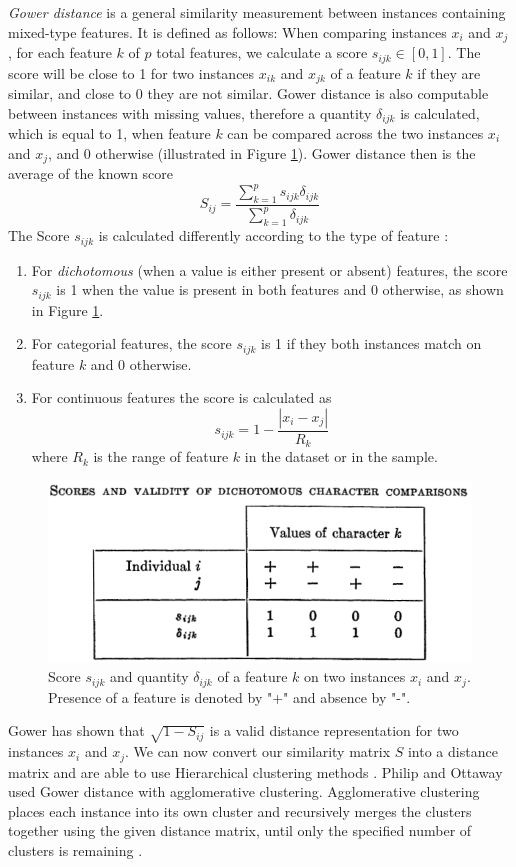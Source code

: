 \textit{Gower distance} \cite{gower} is a general similarity measurement between instances containing mixed-type features. It is defined as follows: When comparing instances $x_i$ and $x_j$, for each feature $k$ of $p$ total features, we calculate a score $s_{ijk} \in [0,1]$. The score will be close to 1 for two instances $x_{ik}$ and $x_{jk}$ of a feature $k$ if they are similar, and close to 0 they are not similar.
Gower distance is also computable between instances with missing values, therefore a quantity $\delta_{ijk}$ is calculated, which is equal to 1, when feature $k$ can be compared across the two instances $x_i$ and $x_j$, and 0 otherwise (illustrated in Figure \ref{gower_dichotomous}).
Gower distance then is the average of the known score
$$S_{ij} = \frac{\sum^p_{k=1}s_{ijk}\delta_{ijk}}{\sum^p_{k=1}\delta_{ijk}}$$
The Score $s_{ijk}$ is calculated differently according to the type of feature \cite{gower}:
\begin{enumerate}
	\item For \textit{dichotomous} (when a value is either present or absent) features, the score $s_{ijk}$ is 1 when the value is present in both features and 0 otherwise, as shown in Figure \ref{gower_dichotomous}.
	\item For categorial features, the score $s_{ijk}$ is 1 if they both instances match on feature $k$ and 0 otherwise.
	\item For continuous features the score is calculated as
	$$s_{ijk} = 1-\frac{|x_i-x_j|}{R_k}$$
	where $R_k$ is the range of feature $k$ in the dataset or in the sample.
\end{enumerate}
\begin{figure}
	\includegraphics[width=\linewidth]{gower-dichotomous.png}
	\caption{Score $s_{ijk}$ and quantity $\delta_{ijk}$ of a feature $k$ on two instances $x_i$ and $x_j$. Presence of a feature is denoted by "+" and absence by "-". \cite{gower}}
	\label{gower_dichotomous}
\end{figure}
Gower \cite{gower} has shown that $\sqrt{1- S_{ij}}$ is a valid distance representation for two instances $x_i$ and $x_j$. We can now convert our similarity matrix $S$ into a distance matrix and are able to use Hierarchical clustering methods \cite{algorithms_for_clustering_data}. Philip and Ottaway \cite{philip_ottaway} used Gower distance with agglomerative clustering. Agglomerative clustering places each instance into its own cluster and recursively merges the clusters together using the given distance matrix, until only the specified number of clusters is remaining \cite{algorithms_for_clustering_data}.

